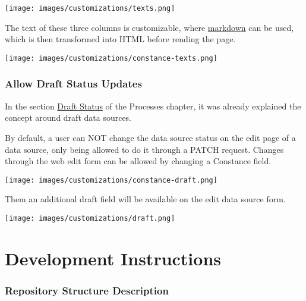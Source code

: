 \documentclass[
]{book}
\begin{document}
\texttt{[image: images/customizations/texts.png]}

The text of these three columns is customizable, where \href{https://www.markdownguide.org/}{markdown} can be used, which is then transformed into HTML before rending the page.

\texttt{[image: images/customizations/constance-texts.png]}

\hypertarget{allow-draft-status-updates}{%
\subsection*{Allow Draft Status Updates}\label{allow-draft-status-updates}}

In the section \href{processes.html\#draft-status}{Draft Status} of the Processes chapter, it was already explained the concept around draft data sources.

By default, a user can NOT change the data source status on the edit page of a data source, only being allowed to do it through a PATCH request.
Changes through the web edit form can be allowed by changing a Constance field.

\texttt{[image: images/customizations/constance-draft.png]}

Them an additional draft field will be available on the edit data source form.

\texttt{[image: images/customizations/draft.png]}

\hypertarget{development-instructions}{%
\chapter{Development Instructions}\label{development-instructions}}

\hypertarget{repository-structure-description}{%
\subsection*{Repository Structure Description}\label{repository-structure-description}}
\end{document}
